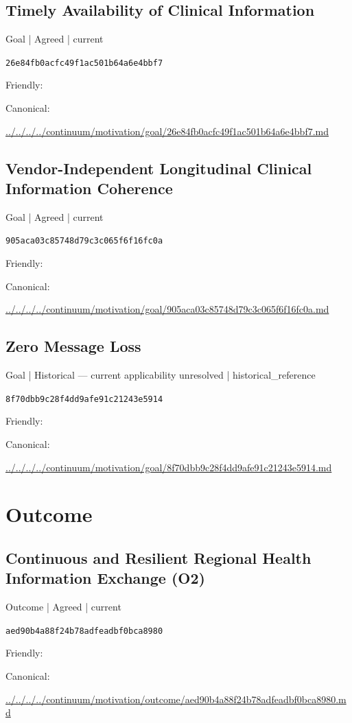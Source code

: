 \documentclass[10pt,a4paper]{article}
\begin{document}
\subsection*{Timely Availability of Clinical Information}
{\small Goal | Agreed | current}\par
\texttt{26e84fb0acfc49f1ac501b64a6e4bbf7}\par
Friendly: \par
Canonical: \par
{\footnotesize\url{../../../../continuum/motivation/goal/26e84fb0acfc49f1ac501b64a6e4bbf7.md}}\par
\subsection*{Vendor-Independent Longitudinal Clinical Information Coherence}
{\small Goal | Agreed | current}\par
\texttt{905aca03c85748d79c3c065f6f16fc0a}\par
Friendly: \par
Canonical: \par
{\footnotesize\url{../../../../continuum/motivation/goal/905aca03c85748d79c3c065f6f16fc0a.md}}\par
\subsection*{Zero Message Loss}
{\small Goal | Historical — current applicability unresolved | historical\_reference}\par
\texttt{8f70dbb9c28f4dd9afe91c21243e5914}\par
Friendly: \par
Canonical: \par
{\footnotesize\url{../../../../continuum/motivation/goal/8f70dbb9c28f4dd9afe91c21243e5914.md}}\par
\section*{Outcome}
\subsection*{Continuous and Resilient Regional Health Information Exchange (O2)}
{\small Outcome | Agreed | current}\par
\texttt{aed90b4a88f24b78adfeadbf0bca8980}\par
Friendly: \par
Canonical: \par
{\footnotesize\url{../../../../continuum/motivation/outcome/aed90b4a88f24b78adfeadbf0bca8980.md}}\par
\end{document}
